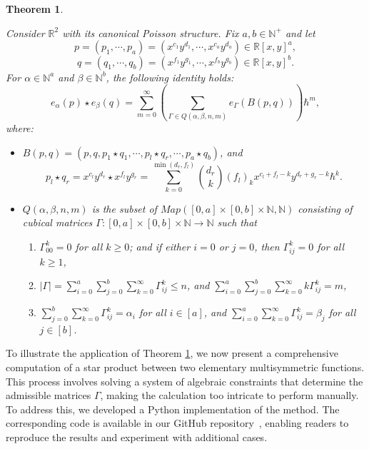 \documentclass[11pt]{article}
\newtheorem{thm}{Theorem}%
\begin{document}
\begin{thm}\label{TeoImportante}

    Consider $\mathbb{R}^{2}$ with its canonical Poisson structure. Fix $a, b\in\mathbb{N}^{+}$ and let $$
    p=(p_1,\cdots,p_a)=
    (x^{c_1}y^{d_1},\cdots,x^{c_a}y^{d_a})\in \mathbb{R}[x,y]^{a},$$ $$
    q=(q_1,\cdots,q_b)=(x^{f_1}y^{g_1},\cdots,x^{f_b}y^{g_b} ) \in \mathbb{R}[x, y]^b
    .$$
For $\alpha \in \mathbb{N}^a$ and $\beta \in \mathbb{N}^b$, the following identity holds:
$$
e_\alpha(p) \star e_\beta(q) = \sum_{m=0}^{\infty} \left( \sum_{\Gamma \in Q(\alpha,\beta,n,m)} e_\Gamma(B(p,q)) \right) \hbar^m,
$$
where:
\begin{itemize}
    \item $B(p,q) = (p, q, p_1 \star q_1, \cdots, p_l \star q_r, \cdots, p_a \star q_b)$, and
    $$
    p_l \star q_r = x^{c_l}y^{d_r} \star x^{f_l}y^{g_r} =
    \sum_{k=0}^{\min(d_r, f_l)} \binom{d_r}{k}(f_l)_{k} x^{c_l + f_l - k} y^{d_r + g_r - k} \hbar^k.
    $$
\item $Q(\alpha,\beta,n,m)$ is the subset of  $Map([0,a]\times[0,b]\times\mathbb{N},\mathbb{N})$ consisting of cubical matrices  $\Gamma:[0,a]\times[0,b]\times\mathbb{N}\longrightarrow\mathbb{N}$ such that
        	 \begin{enumerate}
        \item $\Gamma_{00}^{k} = 0$ for all $k \geq 0$; and if either $i = 0$ or $j = 0$, then $\Gamma_{ij}^{k} = 0$ for all $k \geq 1$,
        \item $|\Gamma| = \sum_{i=0}^{a} \sum_{j=0}^{b} \sum_{k=0}^{\infty} \Gamma_{ij}^{k} \leq n$, and $\sum_{i=0}^{a} \sum_{j=0}^{b} \sum_{k=0}^{\infty} k \Gamma_{ij}^{k} = m$,
        \item $\sum_{j=0}^{b} \sum_{k=0}^{\infty} \Gamma_{ij}^{k} = \alpha_i$ for all $i \in [a]$, and $\sum_{i=0}^{a} \sum_{k=0}^{\infty} \Gamma_{ij}^{k} = \beta_j$ for all $j \in [b]$.
    \end{enumerate}
	\end{itemize}
\end{thm}


To illustrate the application of Theorem \ref{TeoImportante}, we now present a comprehensive computation of a star product between two elementary multisymmetric functions. This process involves solving a system of algebraic constraints that determine the admissible matrices $\Gamma$, making the calculation too intricate to perform manually. To address this, we developed a Python implementation of the method. The corresponding code is available in our GitHub repository~\cite{sierra2025}, enabling readers to reproduce the results and experiment with additional cases.
\end{document}

